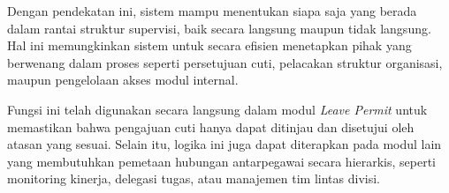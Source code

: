 Dengan pendekatan ini, sistem mampu menentukan siapa saja yang berada dalam rantai struktur supervisi, baik secara langsung maupun tidak langsung. Hal ini memungkinkan sistem untuk secara efisien menetapkan pihak yang berwenang dalam proses seperti persetujuan cuti, pelacakan struktur organisasi, maupun pengelolaan akses modul internal.

Fungsi ini telah digunakan secara langsung dalam modul \textit{Leave Permit} untuk memastikan bahwa pengajuan cuti hanya dapat ditinjau dan disetujui oleh atasan yang sesuai. Selain itu, logika ini juga dapat diterapkan pada modul lain yang membutuhkan pemetaan hubungan antarpegawai secara hierarkis, seperti monitoring kinerja, delegasi tugas, atau manajemen tim lintas divisi.









